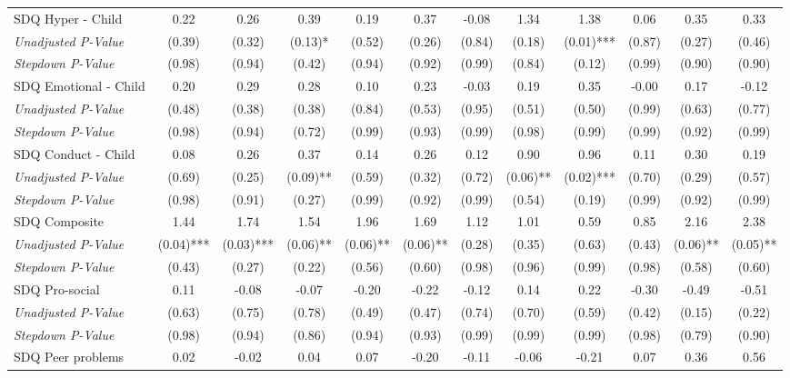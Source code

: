 \begin{tabular}{l c c c c c c c c c c c}
SDQ Hyper - Child & 0.22 & 0.26 & 0.39 & 0.19 & 0.37 & -0.08 & 1.34 & 1.38 & 0.06 & 0.35 & 0.33 \\
\quad \textit{Unadjusted P-Value} & (0.39) & (0.32) & (0.13)* & (0.52) & (0.26) & (0.84) & (0.18) & (0.01)*** & (0.87) & (0.27) & (0.46) \\
\quad \textit{Stepdown P-Value} & (0.98) & (0.94) & (0.42) & (0.94) & (0.92) & (0.99) & (0.84) & (0.12) & (0.99) & (0.90) & (0.90) \\
SDQ Emotional - Child & 0.20 & 0.29 & 0.28 & 0.10 & 0.23 & -0.03 & 0.19 & 0.35 & -0.00 & 0.17 & -0.12 \\
\quad \textit{Unadjusted P-Value} & (0.48) & (0.38) & (0.38) & (0.84) & (0.53) & (0.95) & (0.51) & (0.50) & (0.99) & (0.63) & (0.77) \\
\quad \textit{Stepdown P-Value} & (0.98) & (0.94) & (0.72) & (0.99) & (0.93) & (0.99) & (0.98) & (0.99) & (0.99) & (0.92) & (0.99) \\
SDQ Conduct - Child & 0.08 & 0.26 & 0.37 & 0.14 & 0.26 & 0.12 & 0.90 & 0.96 & 0.11 & 0.30 & 0.19 \\
\quad \textit{Unadjusted P-Value} & (0.69) & (0.25) & (0.09)** & (0.59) & (0.32) & (0.72) & (0.06)** & (0.02)*** & (0.70) & (0.29) & (0.57) \\
\quad \textit{Stepdown P-Value} & (0.98) & (0.91) & (0.27) & (0.99) & (0.92) & (0.99) & (0.54) & (0.19) & (0.99) & (0.92) & (0.99) \\
SDQ Composite & 1.44 & 1.74 & 1.54 & 1.96 & 1.69 & 1.12 & 1.01 & 0.59 & 0.85 & 2.16 & 2.38 \\
\quad \textit{Unadjusted P-Value} & (0.04)*** & (0.03)*** & (0.06)** & (0.06)** & (0.06)** & (0.28) & (0.35) & (0.63) & (0.43) & (0.06)** & (0.05)** \\
\quad \textit{Stepdown P-Value} & (0.43) & (0.27) & (0.22) & (0.56) & (0.60) & (0.98) & (0.96) & (0.99) & (0.98) & (0.58) & (0.60) \\
SDQ Pro-social & 0.11 & -0.08 & -0.07 & -0.20 & -0.22 & -0.12 & 0.14 & 0.22 & -0.30 & -0.49 & -0.51 \\
\quad \textit{Unadjusted P-Value} & (0.63) & (0.75) & (0.78) & (0.49) & (0.47) & (0.74) & (0.70) & (0.59) & (0.42) & (0.15) & (0.22) \\
\quad \textit{Stepdown P-Value} & (0.98) & (0.94) & (0.86) & (0.94) & (0.93) & (0.99) & (0.99) & (0.99) & (0.98) & (0.79) & (0.90) \\
SDQ Peer problems & 0.02 & -0.02 & 0.04 & 0.07 & -0.20 & -0.11 & -0.06 & -0.21 & 0.07 & 0.36 & 0.56 \\

\end{tabular}
